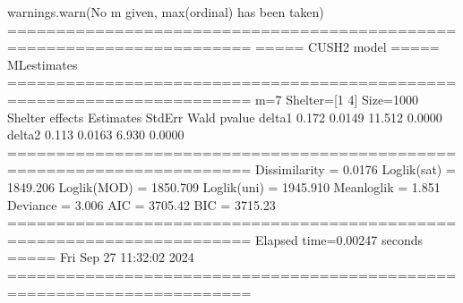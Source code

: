 \documentclass[letterpaper,10pt,english]{sphinxmanual}
\begin{document}
\begin{sphinxVerbatim}[commandchars=\\\{\}]
warnings.warn(\PYGZdq{}No m given, max(ordinal) has been taken\PYGZdq{})
=======================================================================
=====\PYGZgt{}\PYGZgt{}\PYGZgt{} CUSH2 model \PYGZlt{}\PYGZlt{}\PYGZlt{}===== ML\PYGZhy{}estimates
=======================================================================
m=7  Shelter=[1 4]  Size=1000
\PYGZhy{}\PYGZhy{}\PYGZhy{}\PYGZhy{}\PYGZhy{}\PYGZhy{}\PYGZhy{}\PYGZhy{}\PYGZhy{}\PYGZhy{}\PYGZhy{}\PYGZhy{}\PYGZhy{}\PYGZhy{}\PYGZhy{}\PYGZhy{}\PYGZhy{}\PYGZhy{}\PYGZhy{}\PYGZhy{}\PYGZhy{}\PYGZhy{}\PYGZhy{}\PYGZhy{}\PYGZhy{}\PYGZhy{}\PYGZhy{}\PYGZhy{}\PYGZhy{}\PYGZhy{}\PYGZhy{}\PYGZhy{}\PYGZhy{}\PYGZhy{}\PYGZhy{}\PYGZhy{}\PYGZhy{}\PYGZhy{}\PYGZhy{}\PYGZhy{}\PYGZhy{}\PYGZhy{}\PYGZhy{}\PYGZhy{}\PYGZhy{}\PYGZhy{}\PYGZhy{}\PYGZhy{}\PYGZhy{}\PYGZhy{}\PYGZhy{}\PYGZhy{}\PYGZhy{}\PYGZhy{}\PYGZhy{}\PYGZhy{}\PYGZhy{}\PYGZhy{}\PYGZhy{}\PYGZhy{}\PYGZhy{}\PYGZhy{}\PYGZhy{}\PYGZhy{}\PYGZhy{}\PYGZhy{}\PYGZhy{}\PYGZhy{}\PYGZhy{}\PYGZhy{}\PYGZhy{}
Shelter effects
        Estimates  StdErr    Wald  p\PYGZhy{}value
delta1      0.172  0.0149  11.512   0.0000
delta2      0.113  0.0163   6.930   0.0000
=======================================================================
Dissimilarity = 0.0176
Loglik(sat)   = \PYGZhy{}1849.206
Loglik(MOD)   = \PYGZhy{}1850.709
Loglik(uni)   = \PYGZhy{}1945.910
Mean\PYGZhy{}loglik   = \PYGZhy{}1.851
Deviance      = 3.006
\PYGZhy{}\PYGZhy{}\PYGZhy{}\PYGZhy{}\PYGZhy{}\PYGZhy{}\PYGZhy{}\PYGZhy{}\PYGZhy{}\PYGZhy{}\PYGZhy{}\PYGZhy{}\PYGZhy{}\PYGZhy{}\PYGZhy{}\PYGZhy{}\PYGZhy{}\PYGZhy{}\PYGZhy{}\PYGZhy{}\PYGZhy{}\PYGZhy{}\PYGZhy{}\PYGZhy{}\PYGZhy{}\PYGZhy{}\PYGZhy{}\PYGZhy{}\PYGZhy{}\PYGZhy{}\PYGZhy{}\PYGZhy{}\PYGZhy{}\PYGZhy{}\PYGZhy{}\PYGZhy{}\PYGZhy{}\PYGZhy{}\PYGZhy{}\PYGZhy{}\PYGZhy{}\PYGZhy{}\PYGZhy{}\PYGZhy{}\PYGZhy{}\PYGZhy{}\PYGZhy{}\PYGZhy{}\PYGZhy{}\PYGZhy{}\PYGZhy{}\PYGZhy{}\PYGZhy{}\PYGZhy{}\PYGZhy{}\PYGZhy{}\PYGZhy{}\PYGZhy{}\PYGZhy{}\PYGZhy{}\PYGZhy{}\PYGZhy{}\PYGZhy{}\PYGZhy{}\PYGZhy{}\PYGZhy{}\PYGZhy{}\PYGZhy{}\PYGZhy{}\PYGZhy{}\PYGZhy{}
AIC = 3705.42
BIC = 3715.23
=======================================================================
Elapsed time=0.00247 seconds =====\PYGZgt{}\PYGZgt{}\PYGZgt{} Fri Sep 27 11:32:02 2024
=======================================================================
\end{sphinxVerbatim}

\noindent{}
\end{document}

